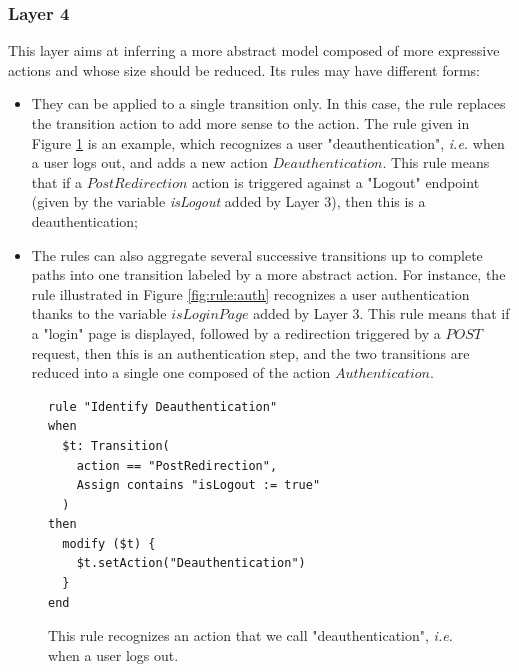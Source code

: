 \subsubsection{Layer 4}

This layer aims at inferring a more abstract model composed of
more expressive actions and whose size should be reduced. Its
rules may have different forms:

\begin{itemize}
\item They can be applied to a single transition only. In this
case, the rule replaces the transition action to add more sense
to the action. The rule given in Figure \ref{fig:rule:deauth} is
an example, which recognizes a user "deauthentication",
\emph{i.e.} when a user logs out, and adds a new action
$Deauthentication$. This rule means that if a $PostRedirection$
action is triggered against a "Logout" endpoint (given by the
variable \textit{isLogout} added by Layer 3), then this is a
deauthentication;

\item The rules can also aggregate several successive transitions
up to complete paths into one transition labeled by a more
abstract action. For instance, the rule illustrated in Figure
\ref{fig:rule:auth} recognizes a user authentication thanks to
the variable $isLoginPage$ added by Layer 3. This rule means that
if a "login" page is displayed, followed by a redirection
triggered by a $POST$ request, then this is an authentication
step, and the two transitions are reduced into a single one
composed of the action $Authentication$.
\end{itemize}

\begin{figure}[h]
\begin{framed}
\begin{BVerbatim}
rule "Identify Deauthentication"
when
  $t: Transition(
    action == "PostRedirection",
    Assign contains "isLogout := true"
  )
then
  modify ($t) {
    $t.setAction("Deauthentication")
  }
end
\end{BVerbatim}
\end{framed}

    \caption{This rule recognizes an action that we call
    "deauthentication", \emph{i.e.} when a user logs out.}
    \label{fig:rule:deauth}
\end{figure}

